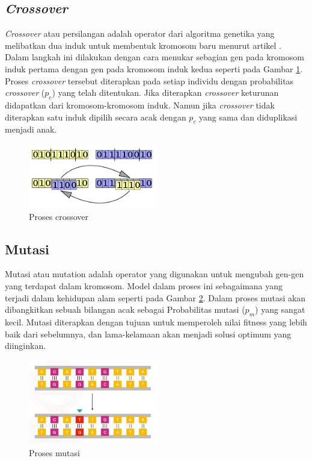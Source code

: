\subsection{\textit{Crossover}}
\textit{Crossover} atau persilangan adalah operator dari algoritma genetika yang melibatkan dua induk untuk membentuk kromosom baru menurut artikel \cite{hardi2014analisis}. Dalam langkah ini dilakukan dengan cara menukar sebagian gen pada kromosom induk pertama dengan gen pada kromosom induk kedua seperti pada Gambar \ref{fig:crossover}. Proses \textit{crossover} tersebut diterapkan pada setiap individu dengan probabilitas \textit{crossover} ($p_c$) yang telah ditentukan. Jika diterapkan \textit{crossover} keturunan didapatkan dari kromosom-kromosom induk. Namun jika \textit{crossover} tidak diterapkan satu induk dipilih secara acak dengan $p_c$ yang sama dan diduplikasi menjadi anak.

\begin{figure}[H]
  \centering
  \includegraphics[width=0.5\textwidth]{Gambar/crossover.png}
  \caption{Proses crossover}
  \label{fig:crossover}
\end{figure}

\subsection{Mutasi}
Mutasi atau mutation adalah operator yang digunakan untuk mengubah gen-gen yang terdapat dalam kromosom. Model dalam proses ini sebagaimana yang terjadi dalam kehidupan alam \cite{rovie2014genetic} seperti pada Gambar \ref{fig:mutasi}. Dalam proses mutasi akan dibangkitkan sebuah bilangan acak sebagai Probabilitas mutasi ($p_m$) yang sangat kecil. Mutasi diterapkan dengan tujuan untuk memperoleh nilai fitness yang lebih baik dari sebelumnya, dan lama-kelamaan akan menjadi solusi optimum yang diinginkan.

\begin{figure}[H]
  \centering
  \includegraphics[width=0.5\textwidth]{Gambar/mutasi.jpg}
  \caption{Proses mutasi}
  \label{fig:mutasi}
\end{figure}
